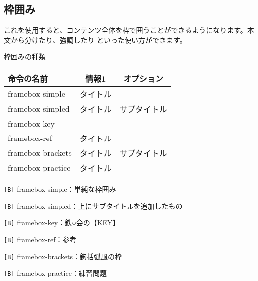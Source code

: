 \begin{multicols*}{2}
\section{枠囲み}
これを使用すると、コンテンツ全体を枠で囲うことができるようになります。本文から分けたり、強調したり
といった使い方ができます。
\begin{framebox-simple}{枠囲みの種類}
\begin{table}[H]
\begin{tabularx}{64mm}{|X|c|c|}\hline
    命令の名前             & 情報1  & オプション  \\ \hline
    framebox-simple   & タイトル &        \\ \hline
    framebox-simpled  & タイトル & サブタイトル \\ \hline
    framebox-key      &      &        \\ \hline
    framebox-ref      & タイトル &        \\ \hline
    framebox-brackets & タイトル & サブタイトル \\ \hline
    framebox-practice & タイトル &        \\ \hline
\end{tabularx}
\end{table}
    \begin{reitemize}
        \item \verb|[B]| framebox-simple：単純な枠囲み
        \item \verb|[B]| framebox-simpled：上にサブタイトルを追加したもの
        \item \verb|[B]| framebox-key：鉄○会の【KEY】
        \item \verb|[B]| framebox-ref：参考
        \item \verb|[B]| framebox-brackets：鉤括弧風の枠
        \item \verb|[B]| framebox-practice：練習問題
    \end{reitemize}
\end{framebox-simple}


\end{multicols*}
